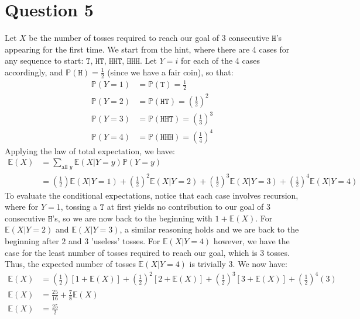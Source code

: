\documentclass[12pt]{article}
\begin{document}
\newpage

\section*{Question 5}

Let $X$ be the number of tosses required to reach our goal of 3 consecutive $\mathtt{H}$'s appearing for the first time. We start from the hint, where there are 4 cases for any sequence to start: $ \mathtt{T}$, $ \mathtt{HT}$, $ \mathtt{HHT}$, $ \mathtt{HHH}$. Let $Y = i$ for each of the 4 cases accordingly, and $ \mathbb{P}(\mathtt{H}) = \frac{1}{2}$ (since we have a fair coin), so that: \begin{align*}
    \mathbb{P}(Y = 1) &= \mathbb{P}(\mathtt{T}) = \frac{1}{2} \\ 
    \mathbb{P}(Y = 2) &= \mathbb{P}(\mathtt{HT}) = \left( \frac{1}{2} \right)^{2} \\ 
    \mathbb{P}(Y = 3) &= \mathbb{P}(\mathtt{HHT}) = \left( \frac{1}{3} \right)^{3} \\ 
    \mathbb{P}(Y = 4) &= \mathbb{P}(\mathtt{HHH}) = \left( \frac{1}{4} \right)^{4} 
\end{align*} Applying the law of total expectation, we have: \begin{align*}
    \mathbb{E}(X) &= \sum_{\text{all } y} \mathbb{E}(X | Y = y) \mathbb{P}(Y = y) \\ 
    &= \left(\frac{1}{2}\right) \mathbb{E}(X | Y = 1) + \left( \frac{1}{2} \right)^{2} \mathbb{E}(X | Y = 2) + \left( \frac{1}{2} \right)^{3} \mathbb{E}(X | Y = 3) + \left( \frac{1}{2} \right)^{4} \mathbb{E}(X | Y = 4)
\end{align*} To evaluate the conditional expectations, notice that each case involves recursion, where for $Y = 1$, tossing a $\mathtt{T}$ at first yields no contribution to our goal of 3 consecutive $\mathtt{H}$'s, so we are now back to the beginning with $1 + \mathbb{E}(X)$. For $ \mathbb{E}(X | Y = 2)$ and $ \mathbb{E}(X | Y = 3)$, a similar reasoning holds and we are back to the beginning after $2$ and $3$ 'useless' tosses. For $ \mathbb{E}(X | Y = 4)$ however, we have the case for the least number of tosses required to reach our goal, which is 3 tosses. Thus, the expected number of tosses $ \mathbb{E}(X | Y = 4)$ is trivially 3. We now have: \begin{align*}
    \mathbb{E}(X) &= \left( \frac{1}{2} \right) \left[ 1 + \mathbb{E}(X) \right] + \left( \frac{1}{2} \right)^{2} \left[ 2 + \mathbb{E}(X) \right] + \left( \frac{1}{2} \right)^{3} \left[ 3 + \mathbb{E}(X) \right] + \left( \frac{1}{2} \right)^{4}(3) \\ 
    \mathbb{E}(X) &= \frac{25}{16} + \frac{7}{8} \mathbb{E}(X) \\ 
    \mathbb{E}(X) &= \boxed{\frac{25}{2}}
\end{align*}
\end{document}
